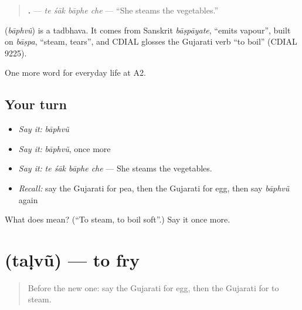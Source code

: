 \begin{quote}
\textbf{   .} — \emph{te śāk bāphe che} — \textquotedblleft{}She steams the vegetables.\textquotedblright{}
\end{quote}

\begin{cousinweb}
\textbf{} (\emph{bāphvũ}) is a tadbhava. It comes from Sanskrit \emph{bāṣpāyate}, \textquotedblleft{}emits vapour\textquotedblright{}, built on \emph{bāṣpa}, \textquotedblleft{}steam, tears\textquotedblright{}, and CDIAL glosses the Gujarati verb \textquotedblleft{}to boil\textquotedblright{} (CDIAL 9225).
\end{cousinweb}

\begin{grammarlens}[title={What you've built}]
One more word for everyday life at A2.
\end{grammarlens}

\subsection*{Your turn}
\begin{itemize}
\raggedright
  \item \emph{Say it:} \emph{bāphvũ}
  \item \emph{Say it:} \emph{bāphvũ}, once more
  \item \emph{Say it:} \emph{te śāk bāphe che} — She steams the vegetables.
  \item \emph{Recall:} say the Gujarati for pea, then the Gujarati for egg, then say \emph{bāphvũ} again
\end{itemize}

\begin{tcolorbox}[breakable,colback=teal!4,colframe=teal!35!black,title={Before you move on}]
What does  mean? (\textquotedblleft{}To steam, to boil soft\textquotedblright{}.) Say it once more.
\end{tcolorbox}
\section[\texorpdfstring{\gu{તળવું} (taḷvũ)}{તળવું (taḷvũ)}]{ (taḷvũ) — to fry}

\label{lesson:GU-C167-talvu-fry}



\begin{quote}
Before the new one: say the Gujarati for egg, then the Gujarati for to steam.
\end{quote}

